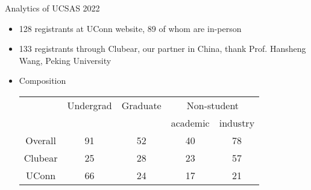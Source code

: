 \documentclass[aspectratio=169, 12pt]{beamer}
\begin{document}
\begin{frame}{Analytics of UCSAS 2022}
  \begin{itemize}
  \item 128 registrants at UConn website, 89 of whom are in-person
  \item 133 registrants through Clubear, our partner in China, thank
    Prof. Hansheng Wang, Peking University
  \item Composition
    \begin{tabular}{ccccc}
      \toprule
      &   Undergrad & Graduate & \multicolumn{2}{c}{Non-student} \\
      \cmidrule{4-5}
      &   &  & academic &  industry\\
      \midrule
      Overall &  91      & 52           & 40            & 78\\
      Clubear   &  25      & 28           & 23            & 57\\
      UConn    &  66      & 24           & 17            & 21\\
      \bottomrule
    \end{tabular}
  \end{itemize}
\end{frame}



\end{document}
